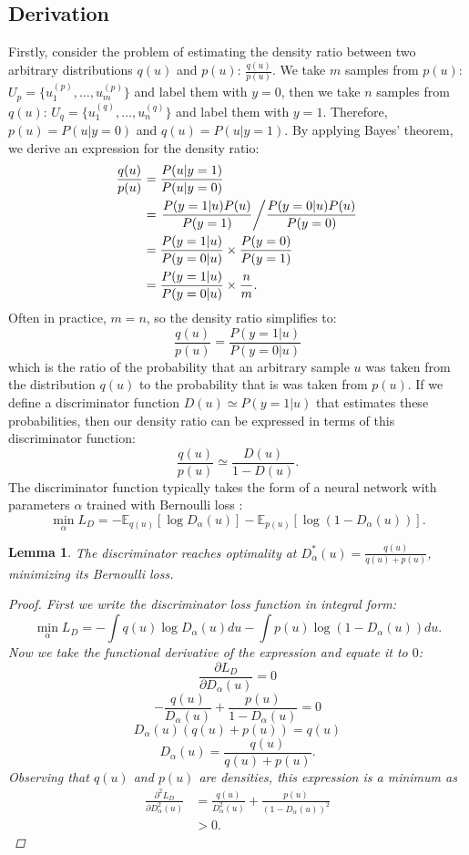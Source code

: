 \documentclass[honours,12pt]{unswthesis}
\newcommand{\E}{\mathbb{E}}
\newtheorem{lemma}[theorem]{Lemma}
\numberwithin{equation}{section}
\theoremstyle{definition}
\begin{document}
\subsection{Derivation}
Firstly, consider the problem of estimating the density ratio between two arbitrary distributions $q(u)$ and $p(u)$: $\frac{q(u)}{p(u)}$. We take $m$ samples from $p(u)$: $U_p=\{u_1^{(p)},\dots,u_m^{(p)}\}$
and label them with $y=0$, then we take $n$ samples from $q(u)$: $U_q=\{u_1^{(q)},\dots, u_n^{(q)}\}$ and label them with $y=1$. Therefore, $p(u)=P(u|y=0)$ and $q(u)=P(u|y=1)$. By applying Bayes' theorem, we derive an expression for the density ratio:
\begin{align*}
\frac{q(u)}{p(u)}&= \frac{P(u|y=1)}{P(u|y=0)}\\
&= \left.\frac{P(y=1|u)P(u)}{P(y=1)}\middle/ \frac{P(y=0|u)P(u)}{P(y=0)}\right.\\
&= \frac{P(y=1|u)}{P(y=0|u)}\times \frac{P(y=0)}{P(y=1)}\\
&= \frac{P(y=1|u)}{P(y=0|u)}\times \frac{n}{m}.
\end{align*}
Often in practice, $m=n$, so the density ratio simplifies to:
\[\frac{q(u)}{p(u)}=\frac{P(y=1|u)}{P(y=0|u)}\]
which is the ratio of the probability that an arbitrary sample $u$ was taken from the distribution $q(u)$ to the probability that is was taken from $p(u)$. If we define a discriminator function $D(u)\simeq P(y=1|u)$ that estimates these probabilities, then our density ratio can be expressed in terms of this discriminator function:
\[\frac{q(u)}{p(u)}\simeq \frac{D(u)}{1-D(u)}.\]
The discriminator function typically takes the form of a neural network with parameters $\alpha$ trained with Bernoulli loss \citep{sugiyama}:
\[\min_\alpha L_D=-\E_{q(u)}[\log D_\alpha(u)]-\E_{p(u)}[\log(1-D_\alpha(u))].\]
\begin{lemma}
The discriminator reaches optimality at $D^*_\alpha(u)=\frac{q(u)}{q(u)+p(u)}$, minimizing its Bernoulli loss\citep{gan}.
\begin{proof}
First we write the discriminator loss function in integral form:
\[\min_\alpha L_D=-\int q(u)\log D_\alpha(u)du-\int p(u)\log(1-D_\alpha(u))du.\]
Now we take the functional derivative of the expression and equate it to $0$:
\[\frac{\partial L_D}{\partial D_\alpha(u)}=0\]
\[-\frac{q(u)}{D_\alpha(u)}+\frac{p(u)}{1-D_\alpha(u)}=0\]
\[D_\alpha(u)(q(u)+p(u))=q(u)\]
\[D_\alpha(u)=\frac{q(u)}{q(u)+p(u)}.\]
Observing that $q(u)$ and $p(u)$ are densities, this expression is a minimum as
\begin{align*}
\frac{\partial^2L_D}{\partial D^2_\alpha(u)}&=\frac{q(u)}{D^2_\alpha(u)}+\frac{p(u)}{(1-D_\alpha(u))^2}\\
&>0.
\end{align*}
\end{proof}
\end{lemma}
\end{document}
